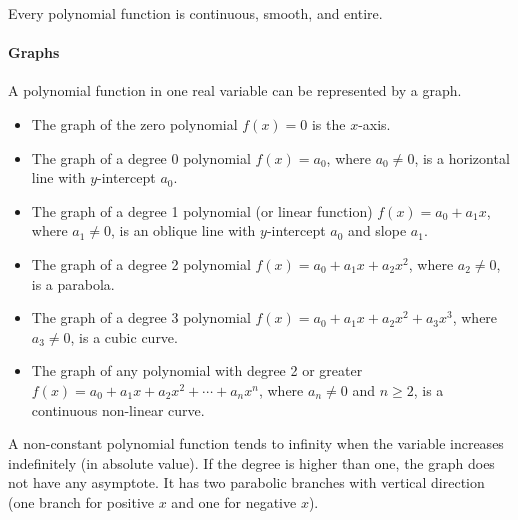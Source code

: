 Every polynomial function is continuous, smooth, and entire.

\paragraph{Graphs}

A polynomial function in one real variable can be represented by a graph.

\begin{itemize}
    \item The graph of the zero polynomial $f(x) = 0$ is the $x$-axis.
    \item The graph of a degree 0 polynomial $f(x) = a_{0}$, where $a_{0} \neq 0$, is a horizontal line with $y$-intercept $a_{0}$.
\end{itemize}


\begin{itemize}
    \item The graph of a degree 1 polynomial (or linear function) $f(x) = a_{0} + a_{1}x$, where $a_{1} \neq 0$, is an oblique line with $y$-intercept $a_{0}$ and slope $a_{1}$.
\end{itemize}


\begin{itemize}
    \item The graph of a degree 2 polynomial $f(x) = a_{0} + a_{1}x + a_{2}x^{2}$, where $a_{2} \neq 0$, is a parabola.
\end{itemize}


\begin{itemize}
    \item The graph of a degree 3 polynomial $f(x) = a_{0} + a_{1}x + a_{2}x^{2} + a_{3}x^{3}$, where $a_{3} \neq 0$, is a cubic curve.
\end{itemize}


\begin{itemize}
    \item The graph of any polynomial with degree 2 or greater $f(x) = a_{0} + a_{1}x + a_{2}x^{2} + \cdots + a_{n}x^{n}$, where $a_{n} \neq 0$ and $n \geq 2$, is a continuous non-linear curve.
\end{itemize}

A non-constant polynomial function tends to infinity when the variable increases indefinitely (in absolute value). If the degree is higher than one, the graph does not have any asymptote. It has two parabolic branches with vertical direction (one branch for positive $x$ and one for negative $x$).


